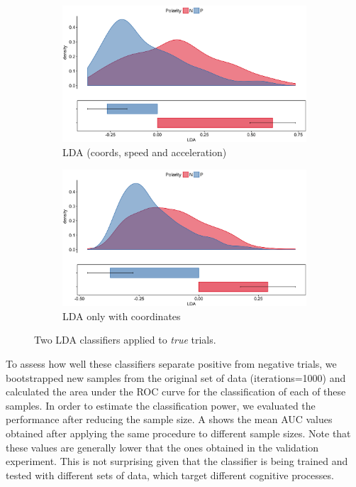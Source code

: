 \documentclass{article}
\begin{document}
\begin{figure}
\centering
\begin{subfigure}[b]{0.45\textwidth}
\includegraphics[width=\textwidth]{lda_distribution_negation.png}
\caption{LDA (coords, speed and acceleration) }
\end{subfigure}
\begin{subfigure}[b]{0.45\textwidth}
\includegraphics[width=\textwidth]{lda_coord_distribution_negation.png}
\caption{LDA only with coordinates}
\end{subfigure}
\caption{Two LDA classifiers applied to \textit{true} trials. }
\label{fig:lda_negation}
\end{figure}

To assess how well these classifiers separate positive from negative trials, we bootstrapped new samples from the original set of data (iterations=1000) and calculated the area under the ROC curve for the classification of each of these samples. 
In order to estimate the classification power, we evaluated the performance after reducing the sample size. A shows the mean AUC values obtained after applying the same procedure to different sample sizes. 
Note that these values are generally lower that the ones obtained in the validation experiment. This is not surprising given that the classifier is being trained and tested with different sets of data, which target different cognitive processes. 
\end{document}

